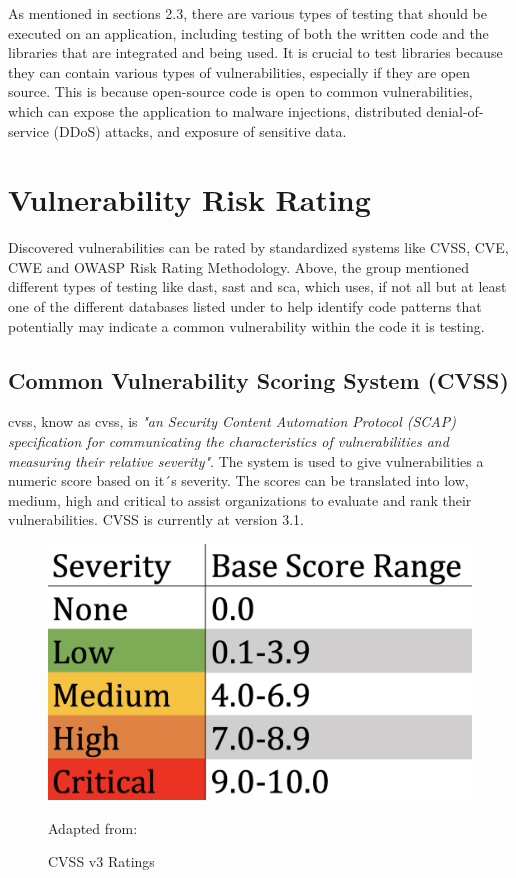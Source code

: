 As mentioned in sections 2.3, there are various types of testing that should be executed on an application, including testing of both the written code and the libraries that are integrated and being used. It is crucial to test libraries because they can contain various types of vulnerabilities, especially if they are open source. This is because open-source code is open to common vulnerabilities, which can expose the application to malware injections, distributed denial-of-service (DDoS) attacks, and exposure of sensitive data. \cite{testlibaries}



\section{Vulnerability Risk Rating}
Discovered vulnerabilities can be rated by standardized systems like CVSS, CVE, CWE and OWASP Risk Rating Methodology. 
Above, the group mentioned different types of testing like \acrshort{dast}, \acrshort{sast} and \acrshort{sca}, which uses, if not all but at least one of the different databases listed under to help identify code patterns that potentially may indicate a common vulnerability within the code it is testing. 


\subsection{Common Vulnerability Scoring System (CVSS)}
\acrlong{cvss}, know as \acrshort{cvss}, is \textit{"an Security Content Automation Protocol (SCAP) specification for communicating the characteristics of vulnerabilities and measuring their relative severity"}\cite{nistCVSS}. The system is used to give vulnerabilities a numeric score based on it´s severity. The scores can be translated into low, medium, high and critical to assist organizations to evaluate and rank their vulnerabilities. CVSS is currently at version 3.1. \cite{CVSS}
\begin{figure}[H]
    \centering
    \includegraphics[scale=0.3]{Images/CVSS.png}
    \caption{CVSS v3 Ratings} Adapted from:\cite{cvssrating}
    \label{fig:CVSS v3 Ratings}
\end{figure}


